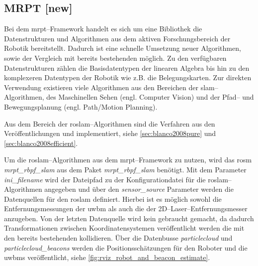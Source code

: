\begin{comment}
--------------------------------------------------------------------------------
- \url{https://www.mrpt.org}
- \url{http://wiki.ros.org/mrpt_slam}
- \url{http://wiki.ros.org/mrpt_navigation}
- \url{https://www.mrpt.org/tutorials/slam-algorithms/rangeonly_slam/}
	- Bayesian range-only SLAM (RO-SLAM) with SOGs
- \url{http://mrpt.ual.es/reference/devel/classmrpt_1_1slam_1_1_c_metric_map_builder_r_b_p_f.html}
	-mrpt::slam::CMetricMapBuilderRBPF Class Reference
	- It is actually a front-end to the class mrpt::slam::CMetricMapBuilderRBPF. All the parameters to the algorithm are passed through a configuration file in the command line. The filter processes actions and observations from a rawlog file and optionally generates a number of files describing the evolution of the filter and the maps.
\end{comment}
\subsection{MRPT [new]}

Bei dem \Gls{mrpt}--Framework handelt es sich um eine Bibliothek die Datenstrukturen und Algorithmen aus dem aktiven Forschungsbereich der Robotik bereitstellt. Dadurch ist eine schnelle Umsetzung neuer Algorithmen, sowie der Vergleich mit bereits bestehenden möglich. Zu den verfügbaren Datenstrukturen zählen die Basisdatentypen der linearen Algebra bis hin zu den komplexeren Datentypen der Robotik wie z.B. die Belegungskarten. Zur direkten Verwendung existieren viele Algorithmen aus den Bereichen der \Gls{slam}--Algorithmen, des Maschinellen Sehen (engl. Computer Vision) und der Pfad-- und Bewegungsplanung (engl. Path/Motion Planning).

Aus dem Bereich der \Gls{roslam}--Algorithmen sind die Verfahren aus den Veröffentlichungen  und  implementiert, siehe \autoref{sec:blanco2008pure} und \ref{sec:blanco2008efficient}.

Um die \Gls{roslam}--Algorithmen aus dem \Gls{mrpt}--Framework zu nutzen, wird das \Gls{rosm} \textit{mrpt\_rbpf\_slam} aus dem Paket \textit{mrpt\_rbpf\_slam} benötigt. Mit dem Parameter \textit{ini\_filename} wird der Dateipfad zu der Konfigurationdatei für die \Gls{roslam}--Algorithmen angegeben und über den \textit{sensor\_source} Parameter werden die Datenquellen für den \Gls{roslam} definiert. Hierbei ist es möglich sowohl die Entfernungsmessungen der \Gls{uwbm} als auch die der 2D--Laser--Entfernungsmesser anzugeben. Von der letzten Datenquelle wird kein gebraucht gemacht, da dadurch Transformationen zwischen Koordinatensystemen veröffentlicht werden die mit den bereits bestehenden kollidieren. Über die Datenbusse \textit{particlecloud} und \textit{particlecloud\_beacons} werden die Positionsschätzungen für den Roboter und die \Glspl{uwbm} veröffentlicht, siehe \autoref{fig:rviz_robot_and_beacon_estimate}.

